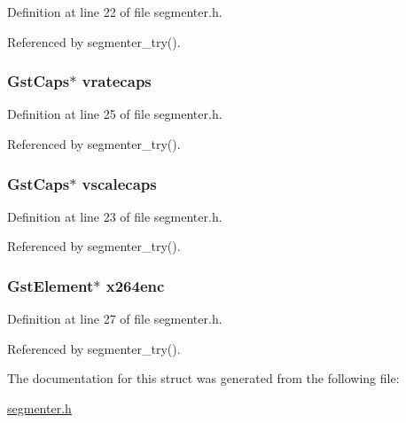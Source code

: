 \-Definition at line 22 of file segmenter.\-h.



\-Referenced by segmenter\-\_\-try().

\hypertarget{struct_video_bag_aa7a0309620904096b3d69456f926e19d}{
\subsubsection[{vratecaps}]{\setlength{\rightskip}{0pt plus 5cm}\-Gst\-Caps$\ast$ {\bf vratecaps}}}\label{struct_video_bag_aa7a0309620904096b3d69456f926e19d}


\-Definition at line 25 of file segmenter.\-h.



\-Referenced by segmenter\-\_\-try().

\hypertarget{struct_video_bag_aa5f3820b0694a8f5358db66149ec7f10}{
\subsubsection[{vscalecaps}]{\setlength{\rightskip}{0pt plus 5cm}\-Gst\-Caps$\ast$ {\bf vscalecaps}}}\label{struct_video_bag_aa5f3820b0694a8f5358db66149ec7f10}


\-Definition at line 23 of file segmenter.\-h.



\-Referenced by segmenter\-\_\-try().

\hypertarget{struct_video_bag_a84465e4de5a0a5270d0b3d0f03e93f03}{
\subsubsection[{x264enc}]{\setlength{\rightskip}{0pt plus 5cm}\-Gst\-Element$\ast$ {\bf x264enc}}}\label{struct_video_bag_a84465e4de5a0a5270d0b3d0f03e93f03}


\-Definition at line 27 of file segmenter.\-h.



\-Referenced by segmenter\-\_\-try().



\-The documentation for this struct was generated from the following file\-:\begin{DoxyCompactItemize}
\item 
\hyperlink{segmenter_8h}{segmenter.\-h}\end{DoxyCompactItemize}
